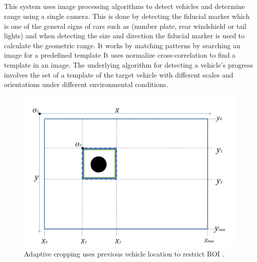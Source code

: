 \documentclass[12pt,a4paper]{report}
\begin{document}
\subsection{\fontsize{12}{12}\selectfont{Vision-Based Adaptive Cruise Control Using Pattern Matching}}

This system uses image processing algorithms to detect vehicles and determine range using a single camera. This is done by detecting the fiducial marker which is one of the general signs of cars such as (number plate, rear windshield or tail lights) and when detecting the size and direction the fiducial marker is used to calculate the geometric range.
It works by matching patterns by searching an image for a predefined template It uses normalize cross-correlation to find a template in an image. The underlying algorithm for detecting a vehicle's progress involves the set of a template of the target vehicle with different scales and orientations under different environmental conditions\cite{PatternMatching}.
\\

\begin{figure}[H]
    \centering
    \graphicspath{ {./images/} }
    \includegraphics[width=1.09\textwidth,height=.5\textheight]{related.png}
    \caption{Adaptive cropping uses previous vehicle location to restrict ROI \cite{PatternMatching}.}
    \label{fig:mesh1}
\end{figure}


\subsection{\fontsize{12}{12}\selectfont{Analysis of Existing Systems}}
 
\end{document}
